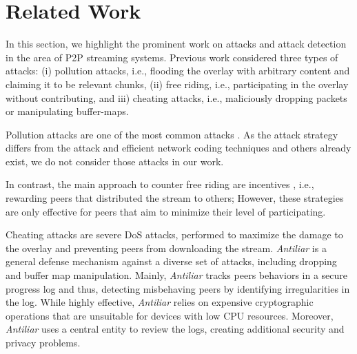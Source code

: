 \section{Related Work}
\label{sec:related}

In this section, we highlight the prominent work on attacks and attack detection in the area of P2P streaming systems.
Previous work considered three types of attacks: (i) pollution attacks, i.e., flooding the overlay with arbitrary content and claiming it to be relevant chunks, (ii) free riding, i.e., participating in the overlay without contributing, and iii) cheating attacks, i.e., maliciously dropping packets or manipulating buffer-maps. 

Pollution attacks are one of the most common attacks \cite{pollution1}. 
As the attack strategy differs from the \drop attack and efficient network coding techniques \cite{nc} and others \cite{pollution2} already exist, we do not consider those attacks in our work.

In contrast, the main approach to counter free riding are incentives \cite{defending,defending2}, i.e., rewarding peers that distributed the stream to others; 
However, these strategies are only effective for peers that aim to minimize their level of participating. 

Cheating attacks are severe DoS attacks, performed to maximize the damage to the overlay and preventing peers from downloading the stream.   
\textit{Antiliar} is a general defense mechanism against a diverse set of attacks, including dropping and buffer map manipulation\cite{antiliar}.
Mainly, \textit{Antiliar} tracks peers behaviors in a secure progress log and thus, detecting misbehaving peers by identifying irregularities in the log. 
While highly effective, \textit{Antiliar} relies on expensive cryptographic operations that are unsuitable for devices with low CPU resources.
Moreover, \textit{Antiliar} uses a central entity to review the logs, creating additional security and privacy problems. 

